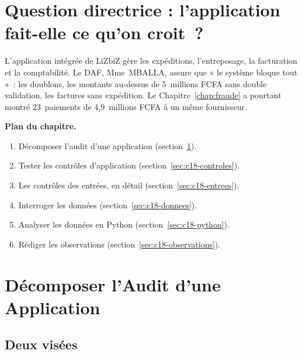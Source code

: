 \bigskip

\section*{Question directrice : l'application fait-elle ce qu'on croit~?}

L'application intégrée de LiZbiZ gère les expéditions, l'entreposage, la
facturation et la comptabilité. Le DAF, Mme~MBALLA, assure que « le
système bloque tout »~: les doublons, les montants au-dessus de
5~millions FCFA sans double validation, les factures sans expédition. Le
Chapitre~\ref{chap:fraude} a pourtant montré 23~paiements de
4,9~millions FCFA à un même fournisseur.

\medskip
\textbf{Plan du chapitre.}
\begin{enumerate}
    \item Décomposer l'audit d'une application (section~\ref{sec:c18-decomposer}).
    \item Tester les contrôles d'application (section~\ref{sec:c18-controles}).
    \item Les contrôles des entrées, en détail (section~\ref{sec:c18-entrees}).
    \item Interroger les données (section~\ref{sec:c18-donnees}).
    \item Analyser les données en Python (section~\ref{sec:c18-python}).
    \item Rédiger les observations (section~\ref{sec:c18-observations}).
\end{enumerate}

\separateur

\section{Décomposer l'Audit d'une Application}
\label{sec:c18-decomposer}

\subsection{Deux visées}

